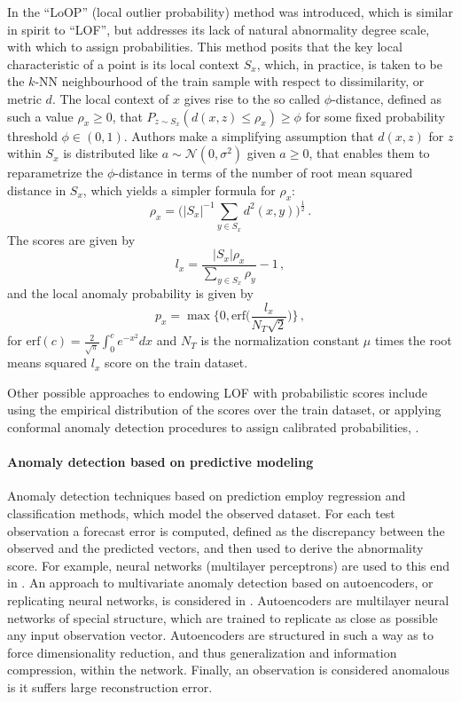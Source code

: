 \documentclass[a4paper,14pt]{extarticle}
\newcommand{\Ncal}{\mathcal{N}}
\begin{document}
In \cite{kriegel2009} the ``LoOP'' (local outlier probability) method was introduced,
which is similar in spirit to ``LOF'', but addresses its lack of natural abnormality
degree scale, with which to assign probabilities. This method posits that the key
local characteristic of a point is its local context $S_x$, which, in practice, is
taken to be the $k$-NN neighbourhood of the train sample with respect to dissimilarity,
or metric $d$. The local context of $x$ gives rise to the so called $\phi$-distance,
defined as such a value $\rho_x\geq 0$, that $P_{z\sim S_x}(d(x,z)\leq \rho_x)\geq \phi$
for some fixed probability threshold $\phi\in(0,1)$. Authors make a simplifying assumption
that $d(x,z)$ for $z$ within $S_x$ is distributed like $a\sim \Ncal(0, \sigma^2)$
given $a\geq0$, that enables them to reparametrize the $\phi$-distance in terms of
the number of root mean squared distance in $S_x$, which yields a simpler formula
for $\rho_x$:
\begin{equation*}
    \rho_x
    = \bigl(|S_x|^{-1} \sum_{y \in S_x} d^2(x, y)\bigr)^\frac{1}{2}
    \,.
\end{equation*}
The scores are given by 
$$ l_x = \frac{|S_x|\rho_x}{\sum_{y\in S_x} \rho_y}-1\,, $$
and the local anomaly probability is given by
$$ p_x = \max\bigl\{0, \text{erf}\bigl(\frac{l_x}{N_T\sqrt{2}}\bigr)\Bigr\}\,, $$
for $\text{erf}(c) = \frac{2}{\sqrt{\pi}} \int_0^c e^{-x^2} dx$ and $N_T$ is the
normalization constant $\mu$ times the root means squared $l_x$ score on the train
dataset.

Other possible approaches to endowing LOF with probabilistic scores include using
the empirical distribution of the scores over the train dataset, or applying conformal
anomaly detection procedures to assign calibrated probabilities, \cite{Laxhammar2014}.


\paragraph{Anomaly detection based on predictive modeling} %
\label{par:anomaly_detection_based_on_predictive_modeling}

Anomaly detection techniques based on prediction employ regression and classification
methods, which model the observed dataset. For each test observation a forecast error
is computed, defined as the discrepancy between the observed and the predicted vectors,
and then used to derive the abnormality score. For example, neural networks (multilayer
perceptrons) are used to this end in \cite{augusteijn2002}. An approach to multivariate
anomaly detection based on autoencoders, or replicating neural networks, is considered
in \cite{hawkins2002,williams2002}. Autoencoders are multilayer neural networks of
special structure, which are trained to replicate as close as possible any input
observation vector. Autoencoders are structured in such a way as to force dimensionality
reduction, and thus generalization and information compression, within the network.
Finally, an observation is considered anomalous is it suffers large reconstruction
error.
\end{document}
